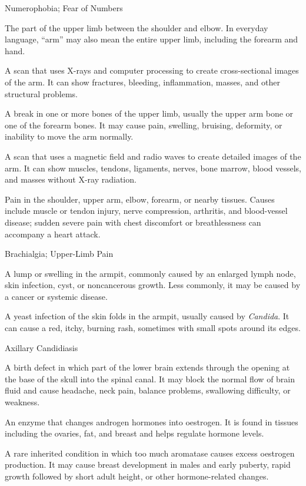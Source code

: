 \synonyms
Numerophobia; Fear of Numbers

 The part of the upper limb between the shoulder and elbow. In everyday language, “arm” may also mean the entire upper limb, including the forearm and hand.

 A scan that uses X-rays and computer processing to create cross-sectional images of the arm. It can show fractures, bleeding, inflammation, masses, and other structural problems.

 A break in one or more bones of the upper limb, usually the upper arm bone or one of the forearm bones. It may cause pain, swelling, bruising, deformity, or inability to move the arm normally.

 A scan that uses a magnetic field and radio waves to create detailed images of the arm. It can show muscles, tendons, ligaments, nerves, bone marrow, blood vessels, and masses without X-ray radiation.

 Pain in the shoulder, upper arm, elbow, forearm, or nearby tissues. Causes include muscle or tendon injury, nerve compression, arthritis, and blood-vessel disease; sudden severe pain with chest discomfort or breathlessness can accompany a heart attack.

\synonyms
Brachialgia; Upper-Limb Pain

 A lump or swelling in the armpit, commonly caused by an enlarged lymph node, skin infection, cyst, or noncancerous growth. Less commonly, it may be caused by a cancer or systemic disease.

 A yeast infection of the skin folds in the
armpit, usually caused by \textit{Candida}. It can cause a red, itchy,
burning rash, sometimes with small spots around its edges.

\synonyms
Axillary Candidiasis

 A birth defect in which part of the lower brain extends through the opening at the base of the skull into the spinal canal. It may block the normal flow of brain fluid and cause headache, neck pain, balance problems, swallowing difficulty, or weakness.

 An enzyme that changes androgen hormones into oestrogen. It is found in tissues including the ovaries, fat, and breast and helps regulate hormone levels.

 A rare inherited condition in which too much aromatase causes excess oestrogen production. It may cause breast development in males and early puberty, rapid growth followed by short adult height, or other hormone-related changes.

